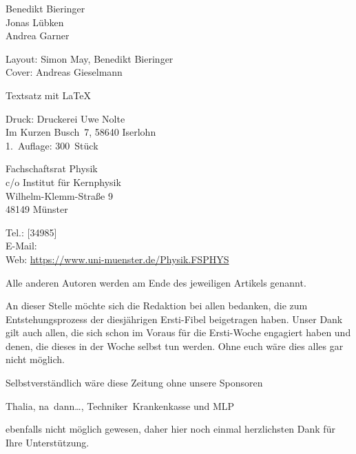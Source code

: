 \begin{multicols*}{2}
{\centering
	\vspace{-1ex}
	\vspace{-1ex}
	Benedikt Bieringer\\
	Jonas Lübken\\
	Andrea Garner
	
	\footnotesize
	Layout: Simon May, Benedikt Bieringer\\
	Cover: Andreas Gieselmann
	
	Textsatz mit \LaTeX
	
	Druck: Druckerei Uwe Nolte\\
	Im Kurzen Busch~7, 58640 Iserlohn\\
	1.~Auflage: 300~Stück

	\vspace{-1ex}
	\vspace{-1ex}
	Fachschaftsrat Physik\\
	c/o Institut für Kernphysik\\
	Wilhelm-Klemm-Straße 9\\
	48149 Münster
	
	Tel.: [34985]\\
	E-Mail: \\
	Web: \url{https://www.uni-muenster.de/Physik.FSPHYS}
\par}

\footnotesize
Alle anderen Autoren werden am Ende des jeweiligen
Artikels genannt.

An dieser Stelle möchte sich die Redaktion bei allen bedanken, die zum Entstehungsprozess der diesjährigen Ersti-Fibel beigetragen haben.
%
Unser Dank gilt auch allen, die sich schon im Voraus für die Ersti-Woche engagiert haben und denen, die dieses in der Woche selbst tun werden.
Ohne euch wäre dies alles gar nicht möglich.

Selbstverständlich wäre diese Zeitung ohne unsere Sponsoren
\begin{center}
	Thalia, na~dann\dots, Techniker~Krankenkasse und MLP
\end{center}
ebenfalls nicht möglich gewesen, daher hier noch einmal herzlichsten Dank für Ihre Unterstützung.
\end{multicols*}

